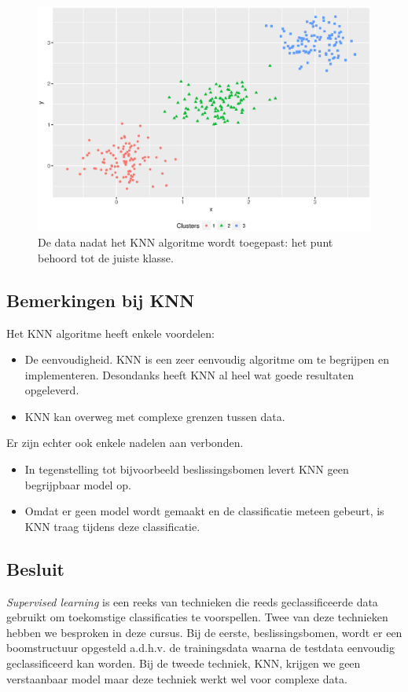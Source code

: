 \begin{figure}[h]
\includegraphics[width=\textwidth]{res/knn_after.eps}
\caption{De data nadat het KNN algoritme wordt toegepast: het punt behoord tot de juiste klasse.}
\label{figure:knn_after}
\end{figure}

\subsection{Bemerkingen bij KNN}
Het KNN algoritme heeft enkele voordelen:
\begin{itemize}
\item De eenvoudigheid. KNN is een zeer eenvoudig algoritme om te begrijpen en implementeren. Desondanks heeft KNN al heel wat goede resultaten opgeleverd.
\item KNN kan overweg met complexe grenzen tussen data.
\end{itemize}
Er zijn echter ook enkele nadelen aan verbonden.
\begin{itemize}
\item In tegenstelling tot bijvoorbeeld beslissingsbomen levert KNN geen begrijpbaar model op.
\item Omdat er geen model wordt gemaakt en de classificatie meteen gebeurt, is KNN traag tijdens deze classificatie.
\end{itemize}

\subsection{Besluit}
\emph{Supervised learning} is een reeks van technieken die reeds geclassificeerde data gebruikt om toekomstige classificaties te voorspellen. Twee van deze technieken hebben we besproken in deze cursus. Bij de eerste, beslissingsbomen, wordt er een boomstructuur opgesteld a.d.h.v. de trainingsdata waarna de testdata eenvoudig geclassificeerd kan worden. Bij de tweede techniek, KNN, krijgen we geen verstaanbaar model maar deze techniek werkt wel voor complexe data.